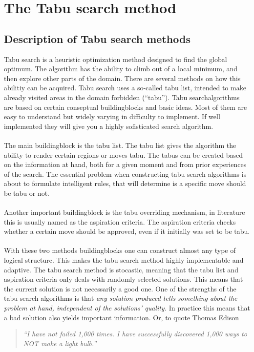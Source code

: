 \section{The Tabu search method}
\subsection{Description of Tabu search methods}
Tabu search is a heuristic optimization method designed to find the global optimum. The algorithm has the ability to climb out of a local minimum, and then explore other parts of the domain. There are several methods on how this abilitiy can be acquired. Tabu search uses a so-called tabu list, intended to make already visited areas in the domain forbidden (``tabu''). Tabu searchalgorithms are based on certain conseptual buildingblocks and basic ideas. Most of them are easy to understand but widely varying in difficulty to implement. If well implemented they will give you a highly sofisticated search algorithm. \\
\\The main buildingblock is the tabu list. The tabu list gives the algorithm the ability to render certain regions or moves tabu. The tabus can be created based on the information at hand, both for a given moment and from prior experiences of the search. The essential problem when constructing tabu search algorithms is about to formulate intelligent rules, that will determine is a specific move should be tabu or not.\\
\\Another important buildingblock is the tabu overriding mechanism, in literature this is usually named as the aspiration criteria. The aspiration criteria checks whether a certain move should be approved, even if it initially was set to be tabu. \\
\\With these two methods buildingblocks one can construct almost any type of logical structure. This makes the tabu search method highly implementable and adaptive. The tabu search method is stocastic, meaning that the tabu list and aspiration criteria only deals with randomly selected solutions. This means that the current solution is not necessarily a good one. One of the strengths of the tabu search algorithms is that \emph{any solution produced tells something about the problem at hand, independent of the solutions' quality.} In practice this means that a bad solution also yields important information.  Or, to quote Thomas Edison 
\begin{quotation}
\emph{``I have not failed 1,000 times.  I have
successfully discovered 1,000 ways to NOT make a light bulb.''}
\end{quotation}
